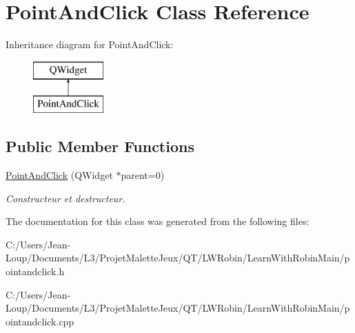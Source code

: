 \hypertarget{class_point_and_click}{}\section{Point\+And\+Click Class Reference}
\label{class_point_and_click}
Inheritance diagram for Point\+And\+Click\+:\begin{figure}[H]
\begin{center}
\leavevmode
\includegraphics[height=2.000000cm]{class_point_and_click}
\end{center}
\end{figure}
\subsection*{Public Member Functions}
\begin{DoxyCompactItemize}
\item 
\mbox{\label{class_point_and_click_a23e3974c812b2dd2c3e8da120e694aca}} 
\hyperlink{class_point_and_click_a23e3974c812b2dd2c3e8da120e694aca}{Point\+And\+Click} (Q\+Widget $\ast$parent=0)
\begin{DoxyCompactList}\small\item\em Constructeur et destructeur. \end{DoxyCompactList}\end{DoxyCompactItemize}


The documentation for this class was generated from the following files\+:\begin{DoxyCompactItemize}
\item 
C\+:/\+Users/\+Jean-\/\+Loup/\+Documents/\+L3/\+Projet\+Malette\+Jeux/\+Q\+T/\+L\+W\+Robin/\+Learn\+With\+Robin\+Main/pointandclick.\+h\item 
C\+:/\+Users/\+Jean-\/\+Loup/\+Documents/\+L3/\+Projet\+Malette\+Jeux/\+Q\+T/\+L\+W\+Robin/\+Learn\+With\+Robin\+Main/pointandclick.\+cpp\end{DoxyCompactItemize}
